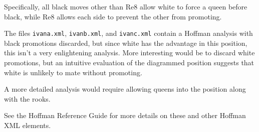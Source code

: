 \documentclass[11pt]{article}
\begin{document}
Specifically, all black moves other than Re8 allow white to force
a queen before black, while Re8 allows each side to prevent the
other from promoting.

The files {\tt ivana.xml}, {\tt ivanb.xml}, and {\tt ivanc.xml}
contain a Hoffman analysis with black promotions discarded, but since
white has the advantage in this position, this isn't a very
enlightening analysis.  More interesting would be to discard white
promotions, but an intuitive evaluation of the diagrammed position
suggests that white is unlikely to mate without promoting.

A more detailed analysis would require allowing queens into
the position along with the rooks.


See the Hoffman Reference Guide for more details on these and other
 Hoffman XML elements.
\end{document}
